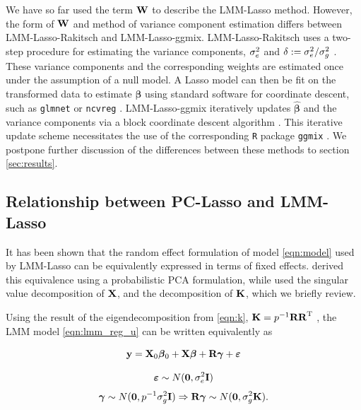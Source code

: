 We have so far used the term $\textbf{W}$ to describe the LMM-Lasso method. However, the form of $\textbf{W}$ and method of variance component estimation differs between LMM-Lasso-Rakitsch and LMM-Lasso-ggmix. LMM-Lasso-Rakitsch uses a two-step procedure for estimating the variance components, $\sigma^2_e$ and $\delta := \sigma^2_e / \sigma^2_g$ \citep{Rakitsch2012}. These variance components and the corresponding weights are estimated once under the assumption of a null model. A Lasso model can then be fit on the transformed data to estimate $\boldsymbol{\beta}$ using standard software for coordinate descent, such as \texttt{glmnet} \citep{glmnet} or \texttt{ncvreg} \citep{ncvreg}. LMM-Lasso-ggmix iteratively updates $\widehat{\boldsymbol{\beta}}$ and the variance components via a block coordinate descent algorithm \citep{bhatnagar2019simultaneous}. This iterative update scheme necessitates the use of the corresponding \texttt{R} package \texttt{ggmix} \citep{ggmix}. We postpone further discussion of the differences between these methods to section \ref{sec:results}.



\subsection{Relationship between PC-Lasso and LMM-Lasso}

It has been shown that the random effect formulation of model \eqref{eqn:model} used by LMM-Lasso can be equivalently expressed in terms of fixed effects. \citet{zhang2015principal} derived this equivalence using a probabilistic PCA formulation, while \citet{hoffman2013correcting} used the singular value decomposition of $\textbf{X}$, and the decomposition of $\textbf{K}$, which we briefly review.

Using the result of the eigendecomposition from \eqref{eqn:k}, $\textbf{K} = p^{-1} \textbf{R} \textbf{R}^{\text{T}}$ , the LMM model \eqref{eqn:lmm_reg_u} can be written equivalently as

\begin{equation}
    \label{eqn:pc_lmm_equiv}
    \textbf{y} = \textbf{X}_0 \boldsymbol{\beta}{}_0 + \textbf{X} \boldsymbol{\beta}{} + \textbf{R} \boldsymbol{\gamma} + \boldsymbol{\varepsilon}{}
\end{equation}

$$ \boldsymbol{\varepsilon}{} \sim N(\boldsymbol{0}, \sigma^2_e \textbf{I}) $$
$$ \boldsymbol{\gamma} \sim N(\boldsymbol{0}, p^{-1} \sigma^2_g \textbf{I}) \Rightarrow \textbf{R} \boldsymbol{\gamma} \sim N(\boldsymbol{0}, \sigma^2_g \textbf{K}).$$

